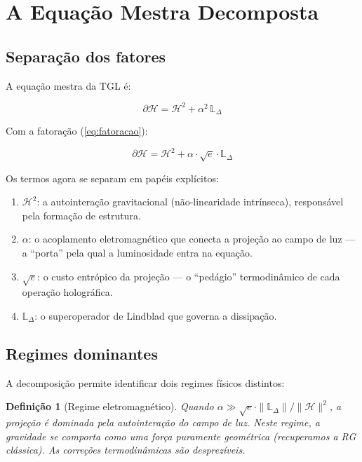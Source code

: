 \documentclass[12pt,a4paper,twoside]{article}
\newtheorem{definition}[theorem]{Definição}
\newcommand{\alphaii}{\alpha^{2}}
\begin{document}
\section{A Equação Mestra Decomposta}
\label{sec:mestra}

\subsection{Separação dos fatores}

A equação mestra da TGL \cite{Miguel2026Fronteira} é:

\begin{equation}
\partial\mathcal{H} = \mathcal{H}^2 + \alphaii\,\mathbb{L}_\Delta
\end{equation}

Com a fatoração (\ref{eq:fatoracao}):

\begin{equationbox}[title={Equação Mestra Fatorada}]
\begin{equation}
\boxed{\partial\mathcal{H} = \mathcal{H}^2 + \alpha \cdot \sqrt{e} \cdot \mathbb{L}_\Delta}
\label{eq:mestra_fatorada}
\end{equation}
\end{equationbox}

Os termos agora se separam em papéis explícitos:

\begin{enumerate}[nosep]
\item $\mathcal{H}^2$: a autointeração gravitacional (não-linearidade intrínseca), responsável pela formação de estrutura.
\item $\alpha$: o acoplamento eletromagnético que conecta a projeção ao campo de luz --- a ``porta'' pela qual a luminosidade entra na equação.
\item $\sqrt{e}$: o custo entrópico da projeção --- o ``pedágio'' termodinâmico de cada operação holográfica.
\item $\mathbb{L}_\Delta$: o superoperador de Lindblad que governa a dissipação.
\end{enumerate}

\subsection{Regimes dominantes}

A decomposição permite identificar dois regimes físicos distintos:

\begin{definition}[Regime eletromagnético]
Quando $\alpha \gg \sqrt{e} \cdot \|\mathbb{L}_\Delta\|/\|\mathcal{H}\|^2$, a projeção é dominada pela autointeração do campo de luz. Neste regime, a gravidade se comporta como uma força puramente geométrica (recuperamos a RG clássica). As correções termodinâmicas são desprezíveis.
\end{definition}
\end{document}
